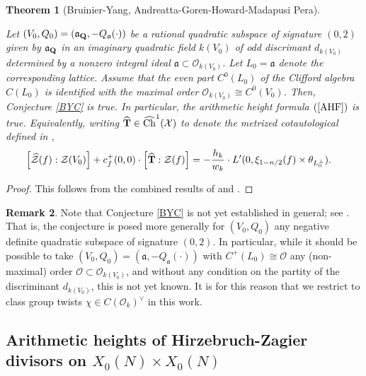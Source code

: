 \documentclass{amsart}
\newtheorem{theorem}{Theorem}[section]
\theoremstyle{definition}
\theoremstyle{definition}
\theoremstyle{definition}
\newtheorem{remark}[theorem]{Remark}
\begin{document}
\begin{theorem}[Bruinier-Yang, Andreatta-Goren-Howard-Madapusi Pera]\label{BYAGHMP}  

Let $(V_0, Q_0) = (\mathfrak{a}_{\bf{Q}}, -Q_{\mathfrak{a}}(\cdot))$ be a rational quadratic subspace of signature $(0, 2)$
given by $\mathfrak{a}_{\bf{Q}}$ in an imaginary quadratic field $k(V_0)$ of odd discrimant $d_{k(V_0)}$
determined by a nonzero integral ideal $\mathfrak{a} \subset \mathcal{O}_{k(V_0)}$. Let $L_0 = \mathfrak{a}$ denote the corresponding lattice.
Assume that the even part $C^0(L_0)$ of the Clifford algebra $C(L_0)$ is identified with the maximal order $\mathcal{O}_{k(V_0)} \cong C^0(V_0)$. 
Then, Conjecture \ref{BYC} is true. In particular, the arithmetic height formula $(\ref{AHF})$ is true. 
Equivalently, writing $\widehat{\bf{T}} \in \widehat{\operatorname{Ch}}^1(\mathcal{X})$ 
to denote the metrized cotautological defined in \cite[$\S$5.3]{AGHMP}, 
\begin{align*} \left[ \widehat{\mathcal{Z}}(f): \mathcal{Z}(V_0) \right] + c_f^+(0,0) \cdot \left[ \widehat{\bf{T}} : \mathcal{Z}(f) \right]
&= - \frac{h_k}{w_k} \cdot L'(0, \xi_{1-n/2}(f) \times \theta_{L_0^{\perp}}). \end{align*} \end{theorem}

\begin{proof} This follows from the combined results of \cite[Theorem 1.2]{BY} and \cite[Theorem A, Theorem 5.7.3]{AGHMP}. \end{proof}

\begin{remark} Note that Conjecture \ref{BYC} is not yet established in general; see \cite[Conjectures 5.1 and 5.2]{BY}. 
That is, the conjecture is posed more generally for $(V_0, Q_0)$ any negative definite quadratic subspace of signature $(0, 2)$. 
In particular, while it should be possible to take $(V_0, Q_0) = (\mathfrak{a}, -Q_{\mathfrak{a}}(\cdot))$ with  $C^+(L_0) \cong \mathcal{O}$ 
any (non-maximal) order $\mathcal{O} \subset \mathcal{O}_{k(V_0)}$, and without any condition on the partity of the discriminant $d_{k(V_0)}$, this is not yet known. 
It is for this reason that we restrict to class group twists $\chi \in C(\mathcal{O}_k)^{\vee}$ in this work. \end{remark}

\subsection{Arithmetic heights of Hirzebruch-Zagier divisors on $X_0(N) \times X_0(N)$}
\end{document}
